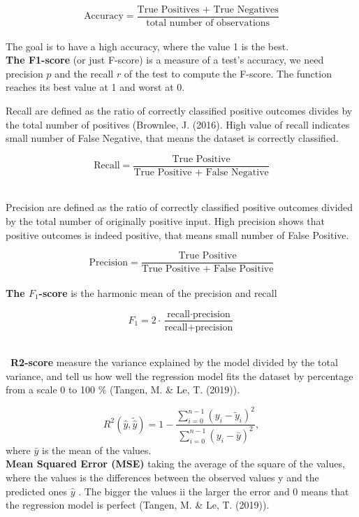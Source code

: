 \documentclass[11pt,english, A4]{article}
\begin{document}
$$ \text{Accuracy} = \frac{\text{True Positives + True Negatives}}{\text{total number of observations}}$$\\
The goal is to have a high accuracy, where the value 1 is the best. \\

\textbf{The F1-score} (or just F-score) is a measure of a test's accuracy, we need precision $p$ and the recall $r$ of the test to compute the F-score. The function reaches its best value at 1 and worst at 0.

Recall are defined as the ratio of correctly classified positive outcomes divides by the total number of positives (Brownlee, J. (2016). High value of recall indicates small number of False Negative, that means the dataset is correctly classified. 

$$ \text{Recall} = \frac{\text{True Positive}}{\text{True Positive + False Negative}} $$
\

Precision are defined as the ratio of correctly classified positive outcomes divided by the total number of originally positive input. High precision shows that positive outcomes is indeed positive, that means small number of False Positive.

$$\text{Precision} = \frac{\text{True Positive}}{\text{True Positive + False Positive}}$$
\\

\textbf{The $F_1$-score} is the harmonic mean of the precision and recall 

$$ F_1 = 2 \cdot{\frac{\text{recall} \cdot \text{precision}}{\text{recall} + \text{precision}}} $$\



\ \textbf{R2-score} measure the variance explained by the model divided by the total variance, and tell us how well the regression model fits the dataset by percentage from a scale 0 to 100 $\%$ (Tangen, M. \& Le, T. (2019)). 

\[
R^2(\hat{y}, \tilde{\hat{y}}) = 1 - \frac{\sum_{i=0}^{n - 1} (y_i - \tilde{y}_i)^2}{\sum_{i=0}^{n - 1} (y_i - \bar{y})^2},
\]
where $\bar{y}$ is the mean of the values.\\


\textbf{Mean Squared Error (MSE)} taking the average of the square of the values, where the values
is the differences between the observed values y and the predicted ones $\hat y$ . The bigger the values ii
the larger the error and 0 means that the regression model is perfect (Tangen, M. \& Le, T. (2019)). 
\end{document}

